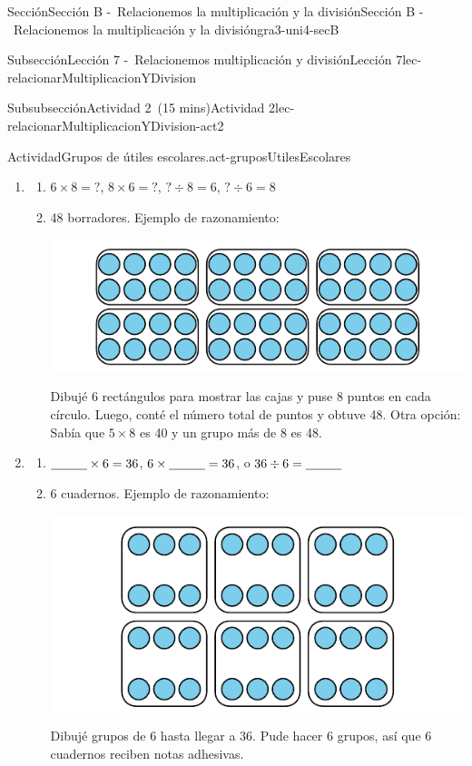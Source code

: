 \documentclass[oneside,10pt,]{article}
\begin{document}
\begin{sectionptx}{Sección}{Sección B -~Relacionemos la multiplicación y la división}{}{Sección B -~Relacionemos la multiplicación y la división}{}{}{gra3-uni4-secB}
\begin{subsectionptx}{Subsección}{Lección 7 -~Relacionemos multiplicación y división}{}{Lección 7}{}{}{lec-relacionarMultiplicacionYDivision}
\begin{subsubsectionptx}{Subsubsección}{Actividad 2~(15 mins)}{}{Actividad 2}{}{}{lec-relacionarMultiplicacionYDivision-act2}
\begin{activity}{Actividad}{Grupos de útiles escolares.}{act-gruposUtilesEscolares}
\begin{enumerate}
\begin{enumerate}
\end{enumerate}
%
\item{}%
\begin{enumerate}
\item{}\(6 \times 8 = {?}\), \(8 \times 6 = {?}\), \({?} \div 8 = 6\), \({?} \div 6 = 8\)%
\item{}48 borradores. Ejemplo de razonamiento:%
\begin{image}{0}{1}{0}{}%
\includegraphics[width=\linewidth]{external/svg-source/tikz-file-149320.pdf}
\end{image}%
Dibujé 6 rectángulos para mostrar las cajas y puse 8 puntos en cada círculo. Luego, conté el número total de puntos y obtuve 48. Otra opción: Sabía que \(5 \times 8\) es 40 y un grupo más de 8 es 48.%
\end{enumerate}
%
\item{}%
\begin{enumerate}
\item{}\(\underline{\hspace{1 cm}} \times 6 = 36\), \(6 \times \underline{\hspace{1 cm}} = 36\), o \(36 \div 6 = \underline{\hspace{1 cm}}\)%
\item{}6 cuadernos. Ejemplo de razonamiento:%
\begin{image}{0}{1}{0}{}%
\includegraphics[width=\linewidth]{external/svg-source/tikz-file-149321.pdf}
\end{image}%
Dibujé grupos de 6 hasta llegar a 36. Pude hacer 6 grupos, así que 6 cuadernos reciben notas adhesivas.%

\end{enumerate}
\end{enumerate}
\end{activity}
\end{subsubsectionptx}
\end{subsectionptx}
\end{sectionptx}
\end{document}
